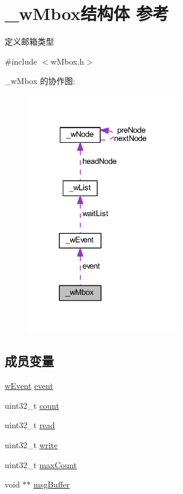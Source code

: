\hypertarget{struct__w_mbox}{}\section{\+\_\+w\+Mbox结构体 参考}
\label{struct__w_mbox}


定义邮箱类型  




{\ttfamily \#include $<$w\+Mbox.\+h$>$}



\+\_\+w\+Mbox 的协作图\+:
\nopagebreak
\begin{figure}[H]
\begin{center}
\leavevmode
\includegraphics[width=192pt]{struct__w_mbox__coll__graph}
\end{center}
\end{figure}
\subsection*{成员变量}
\begin{DoxyCompactItemize}
\item 
\mbox{\hyperlink{w_event_8h_af8b15988a26e1ac0d63eaf3fc5afe9d3}{w\+Event}} \mbox{\hyperlink{struct__w_mbox_ad737d3f95a5cf9ee457f37f1cedfa44a}{event}}
\item 
uint32\+\_\+t \mbox{\hyperlink{struct__w_mbox_a86988a65e0d3ece7990c032c159786d6}{count}}
\item 
uint32\+\_\+t \mbox{\hyperlink{struct__w_mbox_a0a71cf941cf2509857d61e1443ad8eaa}{read}}
\item 
uint32\+\_\+t \mbox{\hyperlink{struct__w_mbox_ac4c9f9c5eac363cc22ecc18669cc3891}{write}}
\item 
uint32\+\_\+t \mbox{\hyperlink{struct__w_mbox_a1cc8a4ba5eee24b560f9869012941e91}{max\+Count}}
\item 
void $\ast$$\ast$ \mbox{\hyperlink{struct__w_mbox_a42b4bab76140c12b77b72ec381001c6c}{msg\+Buffer}}
\end{DoxyCompactItemize}


